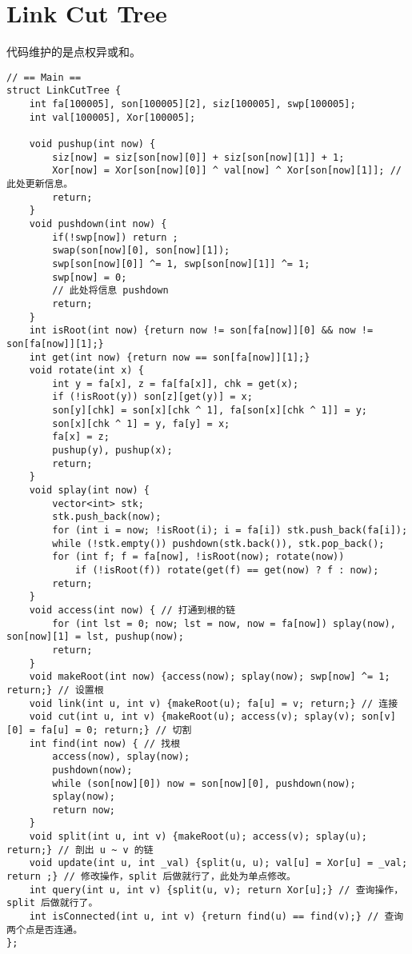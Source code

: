 \section{Link Cut Tree}

代码维护的是点权异或和。

\begin{verbatim}
// == Main ==
struct LinkCutTree {
    int fa[100005], son[100005][2], siz[100005], swp[100005];
    int val[100005], Xor[100005];

    void pushup(int now) {
        siz[now] = siz[son[now][0]] + siz[son[now][1]] + 1;
        Xor[now] = Xor[son[now][0]] ^ val[now] ^ Xor[son[now][1]]; // 此处更新信息。
        return;
    }
    void pushdown(int now) {
        if(!swp[now]) return ;
        swap(son[now][0], son[now][1]);
        swp[son[now][0]] ^= 1, swp[son[now][1]] ^= 1;
        swp[now] = 0;
        // 此处将信息 pushdown
        return;
    }
    int isRoot(int now) {return now != son[fa[now]][0] && now != son[fa[now]][1];}
    int get(int now) {return now == son[fa[now]][1];}
    void rotate(int x) {
        int y = fa[x], z = fa[fa[x]], chk = get(x);
        if (!isRoot(y)) son[z][get(y)] = x;
        son[y][chk] = son[x][chk ^ 1], fa[son[x][chk ^ 1]] = y;
        son[x][chk ^ 1] = y, fa[y] = x;
        fa[x] = z;
        pushup(y), pushup(x);
        return;
    }
    void splay(int now) {
        vector<int> stk;
        stk.push_back(now);
        for (int i = now; !isRoot(i); i = fa[i]) stk.push_back(fa[i]);
        while (!stk.empty()) pushdown(stk.back()), stk.pop_back();
        for (int f; f = fa[now], !isRoot(now); rotate(now))
            if (!isRoot(f)) rotate(get(f) == get(now) ? f : now);
        return;
    }
    void access(int now) { // 打通到根的链
        for (int lst = 0; now; lst = now, now = fa[now]) splay(now), son[now][1] = lst, pushup(now);
        return;
    }
    void makeRoot(int now) {access(now); splay(now); swp[now] ^= 1; return;} // 设置根
    void link(int u, int v) {makeRoot(u); fa[u] = v; return;} // 连接
    void cut(int u, int v) {makeRoot(u); access(v); splay(v); son[v][0] = fa[u] = 0; return;} // 切割
    int find(int now) { // 找根
        access(now), splay(now);
        pushdown(now);
        while (son[now][0]) now = son[now][0], pushdown(now);
        splay(now);
        return now;
    }
    void split(int u, int v) {makeRoot(u); access(v); splay(u); return;} // 剖出 u ~ v 的链
    void update(int u, int _val) {split(u, u); val[u] = Xor[u] = _val; return ;} // 修改操作，split 后做就行了，此处为单点修改。
    int query(int u, int v) {split(u, v); return Xor[u];} // 查询操作，split 后做就行了。
    int isConnected(int u, int v) {return find(u) == find(v);} // 查询两个点是否连通。
};
\end{verbatim}